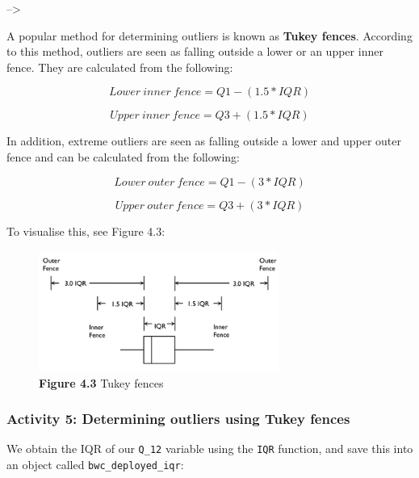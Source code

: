 \documentclass[
]{book}
\newenvironment{Shaded}{\begin{snugshade}}{\end{snugshade}}
\newcommand{\AttributeTok}[1]{\textcolor[rgb]{0.77,0.63,0.00}{#1}}
\newcommand{\ConstantTok}[1]{\textcolor[rgb]{0.00,0.00,0.00}{#1}}
\newcommand{\FunctionTok}[1]{\textcolor[rgb]{0.00,0.00,0.00}{#1}}
\newcommand{\NormalTok}[1]{#1}
\newcommand{\OtherTok}[1]{\textcolor[rgb]{0.56,0.35,0.01}{#1}}
\newcommand{\SpecialCharTok}[1]{\textcolor[rgb]{0.00,0.00,0.00}{#1}}
\begin{document}
--\textgreater{}

A popular method for determining outliers is known as \textbf{Tukey fences}. According to this method, outliers are seen as falling outside a lower or an upper inner fence. They are calculated from the following:

\[ Lower~ inner~ fence = Q1 - (1.5*IQR)\]

\[ Upper~inner ~ fence = Q3 + (1.5 * IQR) \]

In addition, extreme outliers are seen as falling outside a lower and upper outer fence and can be calculated from the following:

\[ Lower~ outer ~fence = Q1 - (3 * IQR)\]

\[ Upper~ outer~ fence = Q3 + (3 * IQR) \]

To visualise this, see Figure 4.3:

\begin{figure}
\centering
\includegraphics[width=0.7\textwidth,height=\textheight]{Images/tukey.png}
\caption{\textbf{Figure 4.3} Tukey fences}
\end{figure}

\hypertarget{activity-5-determining-outliers-using-tukey-fences}{%
\subsubsection{Activity 5: Determining outliers using Tukey fences}\label{activity-5-determining-outliers-using-tukey-fences}}

We obtain the IQR of our \texttt{Q\_12} variable using the \texttt{IQR} function, and save this into an object called \texttt{bwc\_deployed\_iqr}:

\begin{Shaded}
\end{Shaded}
\end{document}
